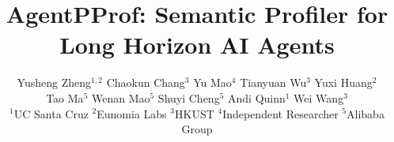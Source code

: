 \documentclass[sigconf,nonacm]{acmart}
\begin{document}
\title{AgentPProf: Semantic Profiler for Long Horizon AI Agents}

\author{%
Yusheng Zheng$^{1,2}$ \quad Chaokun Chang$^{3}$ \quad Yu Mao$^{4}$ \quad Tianyuan Wu$^{3}$ \quad Yuxi Huang$^{2}$ \\
Tao Ma$^{5}$ \quad Wenan Mao$^{5}$ \quad Shuyi Cheng$^{5}$ \quad Andi Quinn$^{1}$ \quad Wei Wang$^{3}$ \\[4pt]
{\normalsize $^{1}$UC Santa Cruz \quad $^{2}$Eunomia Labs \quad $^{3}$HKUST \quad $^{4}$Independent Researcher \quad $^{5}$Alibaba Group}
}

\renewcommand{\shortauthors}{Zheng et al.}
\end{document}
